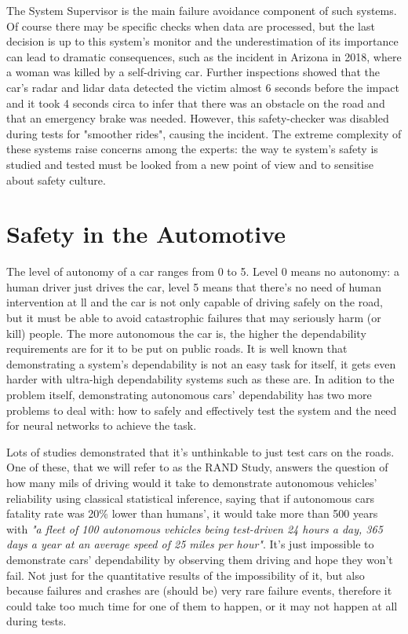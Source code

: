 The System Supervisor is the main failure avoidance component of such systems. Of course there may be specific checks when data are processed, but the last decision is up to this system's monitor and the underestimation of its importance can lead to dramatic consequences, such as the incident in Arizona in 2018, where a woman was killed by a self-driving car.\cite{arizuber} Further inspections showed that the car's radar and lidar data detected the victim almost 6 seconds before the impact and it took 4 seconds circa to infer that there was an obstacle on the road and that an emergency brake was needed. However, this safety-checker was disabled during tests for "smoother rides", causing the incident.\cite{govarizuber}\newline\newline
The extreme complexity of these systems raise concerns among the experts: the way te system's safety is studied and tested must be looked from a new point of view and to sensitise about safety culture.\cite{koopman}


\section{Safety in the Automotive}

The level of autonomy of a car ranges from 0 to 5. Level 0 means no autonomy: a human driver just drives the car, level 5 means that there's no need of human intervention at ll and the car is not only capable of driving safely on the road, but it must be able to avoid catastrophic failures that may seriously harm (or kill) people.
The more autonomous the car is, the higher the dependability requirements are for it to be put on public roads.
It is well known that demonstrating a system's dependability is not an easy task for itself, it gets even harder with ultra-high dependability systems such as these are. In adition to the problem itself, demonstrating autonomous cars' dependability has two more problems to deal with: how to safely and effectively test the system and the need for neural networks to achieve the task.

Lots of studies demonstrated that it's unthinkable to just test cars on the roads. One of these, that we will refer to as the RAND Study, answers the question of how many mils of driving would it take to demonstrate autonomous vehicles' reliability using classical statistical inference, saying that if autonomous cars fatality rate was 20\% lower than humans', it would take more than 500 years with \textsl{"a fleet of 100 autonomous vehicles being test-driven 24 hours a day, 365 days a year at an average speed of 25 miles per hour"}.\cite{randstudy} It's just impossible to demonstrate cars' dependability by observing them driving and hope they won't fail. Not just for the quantitative results of the impossibility of it, but also because failures and crashes are (should be) very rare failure events, therefore it could take too much time for one of them to happen, or it may not happen at all during tests.\newline

